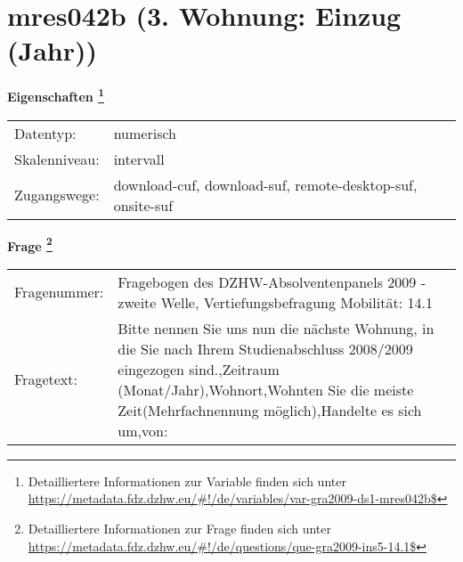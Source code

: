 
    \setcounter{footnote}{0}

    \vspace*{-1.8cm}
	\section{mres042b (3. Wohnung: Einzug (Jahr))}
	\label{section:mres042b}



    \vspace*{0.5cm}
    \noindent\textbf{Eigenschaften
	\footnote{Detailliertere Informationen zur Variable finden sich unter
		\url{https://metadata.fdz.dzhw.eu/\#!/de/variables/var-gra2009-ds1-mres042b$}}}\\
	\begin{tabularx}{\hsize}{@{}lX}
	Datentyp: & numerisch \\
	Skalenniveau: & intervall \\
	Zugangswege: &
	  download-cuf, 
	  download-suf, 
	  remote-desktop-suf, 
	  onsite-suf
 \\
    \end{tabularx}



				\vspace*{0.5cm}
                \noindent\textbf{Frage
	                \footnote{Detailliertere Informationen zur Frage finden sich unter
		              \url{https://metadata.fdz.dzhw.eu/\#!/de/questions/que-gra2009-ins5-14.1$}}}\\
				\begin{tabularx}{\hsize}{@{}lX}
					Fragenummer: &
					  Fragebogen des DZHW-Absolventenpanels 2009 - zweite Welle, Vertiefungsbefragung Mobilität:
					  14.1
 \\
					Fragetext: & Bitte nennen Sie uns nun die nächste Wohnung, in die Sie nach Ihrem Studienabschluss 2008/2009 eingezogen sind.,Zeitraum (Monat/Jahr),Wohnort,Wohnten Sie die meiste Zeit(Mehrfachnennung möglich),Handelte es sich um,von: \\
				\end{tabularx}





